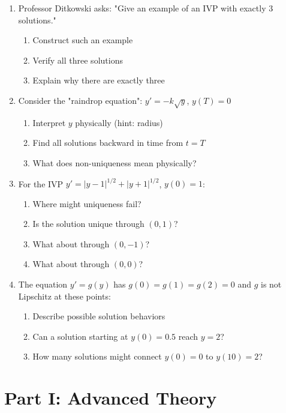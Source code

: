 \documentclass[12pt]{article}
\begin{document}
\begin{enumerate}[start=21]
    \item Professor Ditkowski asks: "Give an example of an IVP with exactly 3 solutions."
    \begin{enumerate}[label=(\alph*)]
        \item Construct such an example
        \item Verify all three solutions
        \item Explain why there are exactly three
    \end{enumerate}
    
    \item Consider the "raindrop equation": $y' = -k\sqrt{y}$, $y(T) = 0$
    \begin{enumerate}[label=(\alph*)]
        \item Interpret $y$ physically (hint: radius)
        \item Find all solutions backward in time from $t = T$
        \item What does non-uniqueness mean physically?
    \end{enumerate}
    
    \item For the IVP $y' = |y-1|^{1/2} + |y+1|^{1/2}$, $y(0) = 1$:
    \begin{enumerate}[label=(\alph*)]
        \item Where might uniqueness fail?
        \item Is the solution unique through $(0,1)$?
        \item What about through $(0,-1)$?
        \item What about through $(0,0)$?
    \end{enumerate}
    
    \item The equation $y' = g(y)$ has $g(0) = g(1) = g(2) = 0$ and $g$ is not Lipschitz at these points:
    \begin{enumerate}[label=(\alph*)]
        \item Describe possible solution behaviors
        \item Can a solution starting at $y(0) = 0.5$ reach $y = 2$?
        \item How many solutions might connect $y(0) = 0$ to $y(10) = 2$?
    \end{enumerate}
\end{enumerate}

\section*{Part I: Advanced Theory}
\end{document}
